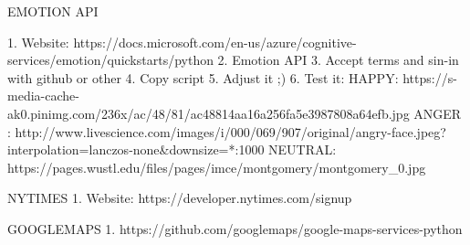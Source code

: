 EMOTION API

1. Website: https://docs.microsoft.com/en-us/azure/cognitive-services/emotion/quickstarts/python
2. Emotion API
3. Accept terms and sin-in with github or other
4. Copy script
5. Adjust it ;)
6. Test it: 
HAPPY: https://s-media-cache-ak0.pinimg.com/236x/ac/48/81/ac48814aa16a256fa5e3987808a64efb.jpg
ANGER : http://www.livescience.com/images/i/000/069/907/original/angry-face.jpeg?interpolation=lanczos-none&downsize=*:1000
NEUTRAL: https://pages.wustl.edu/files/pages/imce/montgomery/montgomery_0.jpg

NYTIMES
1. Website: https://developer.nytimes.com/signup

GOOGLEMAPS
1. https://github.com/googlemaps/google-maps-services-python